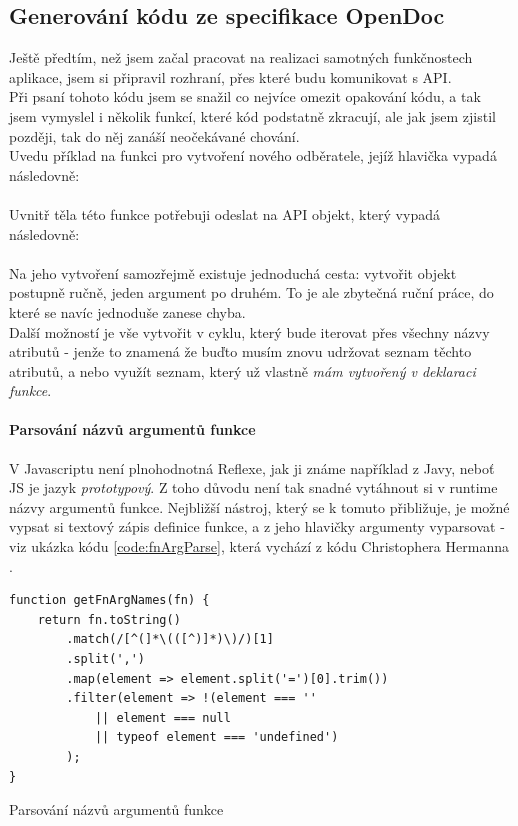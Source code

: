 
\subsection{Generování kódu ze specifikace OpenDoc}\label{implementation:codegen}

Ještě předtím, než jsem začal pracovat na realizaci samotných funkčnostech aplikace, jsem si připravil rozhraní, přes které budu komunikovat s API.\\
Při psaní tohoto kódu jsem se snažil co nejvíce omezit opakování kódu, a tak jsem vymyslel i několik funkcí, které kód podstatně zkracují, ale jak jsem zjistil později, tak do něj zanáší neočekávané chování.\\
Uvedu příklad na funkci pro vytvoření nového odběratele, jejíž hlavička vypadá následovně:\\
\\
Uvnitř těla této funkce potřebuji odeslat na API objekt, který vypadá následovně:\\
\\
Na jeho vytvoření samozřejmě existuje jednoduchá cesta: vytvořit objekt postupně ručně, jeden argument po druhém. To je ale zbytečná ruční práce, do které se navíc jednoduše zanese chyba.\\
Další možností je vše vytvořit v cyklu, který bude iterovat přes všechny názvy atributů - jenže to znamená že buďto musím znovu udržovat seznam těchto atributů, a nebo využít seznam, který už vlastně \emph{mám vytvořený v deklaraci funkce}.\\

\paragraph{Parsování názvů argumentů funkce} V Javascriptu není plnohodnotná Reflexe, jak ji známe například z Javy, neboť JS je jazyk \emph{prototypový}. Z toho důvodu není tak snadné vytáhnout si v runtime názvy argumentů funkce. Nejbližší nástroj, který se k tomuto přibližuje, je možné vypsat si textový zápis definice funkce, a z jeho hlavičky argumenty vyparsovat - viz ukázka kódu \ref{code:fnArgParse}, která vychází z kódu Christophera Hermanna \cite{fn-parse}.

\begin{listing}[h]
\begin{verbatim}
function getFnArgNames(fn) {
    return fn.toString()
        .match(/[^(]*\(([^)]*)\)/)[1]
        .split(',')
        .map(element => element.split('=')[0].trim())
        .filter(element => !(element === '' 
            || element === null 
            || typeof element === 'undefined')
        );
}
\end{verbatim}
\caption{Parsování názvů argumentů funkce} \label{code:fnArgParse}
\end{listing}

